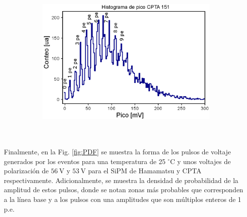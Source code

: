 \begin{figure}[h!]
\begin{subfigure}[b]{0.49\textwidth}
         \includegraphics[width=1.1\textwidth]{Images/Peak_CPTA.eps}
         \label{fig:peak_CPTA}
     \end{subfigure}
        \label{fig:peak}
\end{figure}
\\ \\
Finalmente, en la Fig. \ref{fig:PDF} se muestra la forma de los pulsos de voltaje generados por los eventos para una temperatura de 25 $^\circ$C y unos voltajes de polarización de $56~\mbox{V}$ y $53~\mbox{V}$ para el SiPM de Hamamatsu y CPTA respectivamente. Adicionalmente, se muestra la densidad de probabilidad de la amplitud de estos pulsos, donde se notan zonas más probables que corresponden a la línea base y a los pulsos con una amplitudes que son múltiplos enteros de 1 p.e.  
